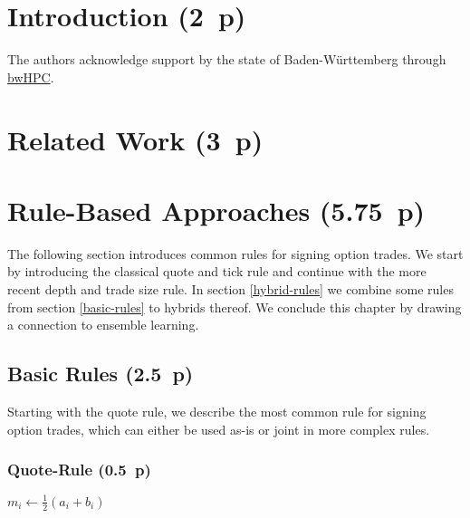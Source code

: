 \section{Introduction (2~p)}\label{sec:introduction}

The authors acknowledge support by the state of Baden-Württemberg through \href{https://www.bwhpc.de/}{bwHPC}.

\section{Related Work (3~p)}\label{sec:related-work}

\newpage
\section{Rule-Based Approaches (5.75~p)}\label{sec:rule-based-approaches}


The following section introduces common rules for signing option trades. We start by introducing the classical quote and tick rule and continue with the more recent depth and trade size rule. In section \ref{hybrid-rules} we combine some rules from section \ref{basic-rules} to hybrids thereof. We conclude this chapter by drawing a connection to ensemble learning.

\subsection{Basic Rules (2.5~p)}\label{sec:basic-rules}

Starting with the quote rule, we describe the most common rule for signing option trades, which can either be used as-is or joint in more complex rules.

\subsubsection{Quote-Rule (0.5~p)}\label{sec:quote-rule}

\begin{algorithm}


  \caption{$\operatorname{\mathtt{quote}}$ \label{sec:alg:quote-rule}}


  \BlankLine %

  $m_i \leftarrow \frac{1}{2}(a_i + b_i)$ 

  \uElse{%
    \Return
  }
\end{algorithm}





